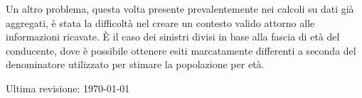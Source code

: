 \documentclass[a4paper]{article}
\begin{document}
Un altro problema, questa volta presente prevalentemente nei calcoli su dati già aggregati, 
è stata la difficoltà nel creare un contesto valido attorno alle informazioni ricavate. 
\`E il caso dei sinistri divisi in base alla fascia di età del conducente, dove è possibile 
ottenere esiti marcatamente differenti a seconda del denominatore utilizzato per 
stimare la popolazione per età.

\raggedleft\vfill\scriptsize Ultima revisione: \today\par
\end{document}
